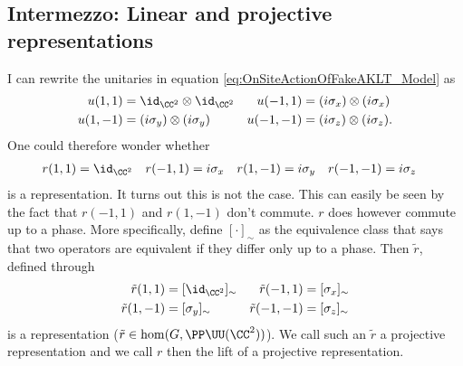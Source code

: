 \subsection{Intermezzo: Linear and projective representations}
I can rewrite the unitaries in equation \eqref{eq:OnSiteActionOfFakeAKLT_Model} as
\begin{align}\label{eq:OnSiteActionOfFakeAKLT_Model_Rewritten}
u(1,1)&=\id_{\CC^2}\otimes\id_{\CC^2}&u(-1,1)&=(i\sigma_x)\otimes(i\sigma_x)\\
\nonumber
u(1,-1)&=(i\sigma_y)\otimes(i\sigma_y)&u(-1,-1)&=(i\sigma_z)\otimes(i\sigma_z).
\end{align}
One could therefore wonder whether
\begin{align}\label{eq:OnSiteActionOfFakeAKLT_Model_OnC2}
r(1,1)&=\id_{\CC^2}&r(-1,1)&=i\sigma_x&r(1,-1)&=i\sigma_y&r(-1,-1)&=i\sigma_z
\end{align}
is a representation. It turns out this is not the case. This can easily be seen by the fact that $r(-1,1)$ and $r(1,-1)$ don't commute. $r$ does however commute up to a phase. More specifically, define $[\cdot]_\sim$ as the equivalence class that says that two operators are equivalent if they differ only up to a phase. Then $\tilde{r}$, defined through
\begin{align}\label{eq:OnSiteActionOfFakeAKLT_Model_OnC2_ProjectiveRep}
\tilde r(1,1)&=[\id_{\CC^2}]_\sim&\tilde r(-1,1)&=[\sigma_x]_\sim\\
\nonumber
\tilde r(1,-1)&=[\sigma_y]_\sim&\tilde r(-1,-1)&=[\sigma_z]_\sim
\end{align}
is a representation ($\tilde{r}\in\hom(G,\PP\UU(\CC^2))$). We call such an $\tilde{r}$ a projective representation and we call $r$ then the lift of a projective representation.
